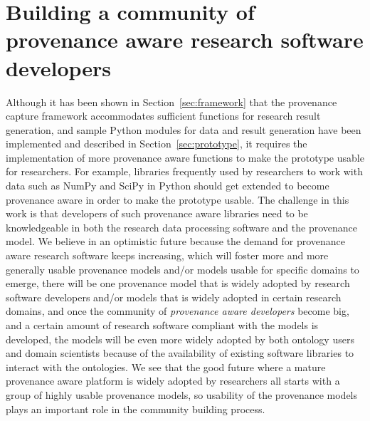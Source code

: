 \section{Building a community of provenance aware research software developers}
Although it has been shown in Section~\ref{sec:framework} that the provenance capture framework accommodates sufficient functions for research result generation, and sample Python modules for data and result generation have been implemented and described in Section~\ref{sec:prototype}, it requires the implementation of more provenance aware functions to make the prototype usable for researchers. For example, libraries frequently used by researchers to work with data such as NumPy and SciPy in Python should get extended to become provenance aware in order to make the prototype usable. The challenge in this work is that developers of such provenance aware libraries need to be knowledgeable in both the research data processing software and the provenance model. We believe in an optimistic future because the demand for provenance aware research software keeps increasing, which will foster more and more generally usable provenance models and/or models usable for specific domains to emerge, there will be one provenance model that is widely adopted by research software developers and/or models that is widely adopted in certain research domains, and once the community of \emph{provenance aware developers} become big, and a certain amount of research software compliant with the models is developed, the models will be even more widely adopted by both ontology users and domain scientists because of the availability of existing software libraries to interact with the ontologies. We see that the good future where a mature provenance aware platform is widely adopted by researchers all starts with a group of highly usable provenance models, so usability of the provenance models plays an important role in the community building process.

